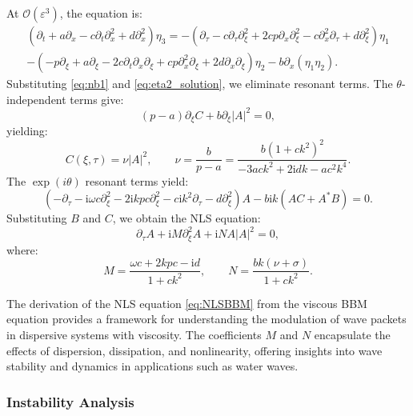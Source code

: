 \documentclass[alpha-refs, 12pt]{wiley-article}
\renewcommand{\O}{\mathcal{O}}
\newcommand{\ui}{\mathrm{i}}
\newcommand{\eps}{\varepsilon}
\begin{document}
At $\O(\eps^3)$, the equation is:
\begin{multline}\label{eq:third_order_b}
  \left( \partial_t + a \partial_x - c \partial_t \partial_x^2 + d \partial_x^2 \right) \eta_3 = - \left( \partial_\tau - c \partial_\tau \partial_\xi^2 + 2 c p \partial_x \partial_\xi^2 - c \partial_x^2 \partial_\tau + d \partial_\xi^2 \right) \eta_1 \\
- \left( -p \partial_\xi + a \partial_\xi - 2 c \partial_t \partial_x \partial_\xi + c p \partial_x^2 \partial_\xi + 2 d \partial_x \partial_\xi \right) \eta_2 - b \partial_x (\eta_1 \eta_2).
\end{multline}
Substituting \eqref{eq:nb1} and \eqref{eq:eta2_solution}, we eliminate resonant terms. The $\theta$-independent terms give:
\begin{equation}\label{eq:C_equation}
  (p - a) \partial_\xi C + b \partial_\xi |A|^2 = 0,
\end{equation}
yielding:
\[
  C(\xi, \tau) = \nu |A|^2, \qquad \nu = \frac{b}{p - a} = \frac{b (1 + c k^2)^2}{-3 a c k^2 + 2 \ui d k - a c^2 k^4}.
\]
The $\exp(i \theta)$ resonant terms yield:
\begin{equation}\label{eq:resonance_bbm}
  \left( -\partial_\tau - \ui \omega c \partial_\xi^2 - 2 \ui k p c \partial_\xi^2 - c \ui k^2 \partial_\tau - d \partial_\xi^2 \right) A - b \ui k (A C + A^* B) = 0.
\end{equation}
Substituting $B$ and $C$, we obtain the NLS equation:
\begin{equation}\label{eq:NLSBBM}
  \partial_\tau A + \ui M \partial_\xi^2 A + \ui N A |A|^2 = 0,
\end{equation}
where:
\[
  M = \frac{\omega c + 2 k p c - \ui d}{1 + c k^2}, \qquad N = \frac{b k (\nu + \sigma)}{1 + c k^2}.
\]

The derivation of the NLS equation \eqref{eq:NLSBBM} from the viscous BBM equation provides a framework for understanding the modulation of wave packets in dispersive systems with viscosity. The coefficients $M$ and $N$ encapsulate the effects of dispersion, dissipation, and nonlinearity, offering insights into wave stability and dynamics in applications such as water waves.

\subsubsection{Instability Analysis}
\end{document}
